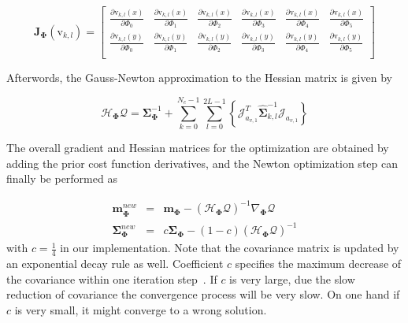 \begin{equation}
  \label{eq:bigj}
\mathbf{J}_{\mathbf{\Phi}}(\mathrm{v}_{k,l}) =
\left[ {\begin{array}{cccccc}
\frac{\partial \mathrm{v}_{k,l}(x)}{\partial \Phi_0}& \frac{\partial \mathrm{v}_{k,l}(x)}{\partial \Phi_1}& \frac{\partial \mathrm{v}_{k,l}(x)}{\partial \Phi_2}& \frac{\partial \mathrm{v}_{k,l}(x)}{\partial \Phi_3}&\frac{\partial \mathrm{v}_{k,l}(x)}{\partial \Phi_4} &\frac{\partial \mathrm{v}_{k,l}(x)}{\partial \Phi_5}  \\
\frac{\partial \mathrm{v}_{k,l}(y)}{\partial \Phi_0}& \frac{\partial \mathrm{v}_{k,l}(y)}{\partial \Phi_1}& \frac{\partial \mathrm{v}_{k,l}(y)}{\partial \Phi_2}& \frac{\partial \mathrm{v}_{k,l}(y)}{\partial \Phi_3}&\frac{\partial \mathrm{v}_{k,l}(y)}{\partial \Phi_4} &\frac{\partial \mathrm{v}_{k,l}(y)}{\partial \Phi_5}  \\
 \end{array} } \right]
\end{equation}

Afterwords, the Gauss-Newton approximation to the Hessian
matrix is given by

\begin{equation}
  \label{eq:hessian}
  \mathcal{H}_{\mathbf{\Phi}} \mathcal{Q}  =
  \mathbf{\Sigma}_{\mathbf{\Phi}}^{-1} + \sum_{k = 0}^{N_{c}-1}
  \sum_{l=0}^{2L-1} \left\{\mathcal{J}_{a_{v,1}}^T\hat{\mathbf{\Sigma}}_{k,l}^{-1}\mathcal{J}_{a_{v,1}}\right\}
\end{equation}


The overall gradient and Hessian matrices for the optimization
are obtained by adding the prior cost function
derivatives, and the Newton optimization step can finally be
performed as

\begin{eqnarray}
\label{eq:newton}
  \mathbf{m}_{\mathbf{\Phi}}^{new} & = &
  \mathbf{m}_{\mathbf{\Phi}} - (\mathcal{H}_{\mathbf{\Phi}}
  \mathcal{Q})^{-1} \nabla_{\mathbf{\Phi}} \mathcal{Q} \nonumber \\
  \mathbf{\Sigma}_{\mathbf{\Phi}}^{new} & = &
  c\mathbf{\Sigma}_{\mathbf{\Phi}} - (1-c)(\mathcal{H}_{\mathbf{\Phi}}
  \mathcal{Q})^{-1}
\end{eqnarray}
with $c = \frac{1}{4}$ in our implementation. Note that the covariance
matrix is updated by an exponential decay rule as well. Coefficient $c$ specifies the
maximum decrease of the covariance within one iteration step~\cite{hanek2004contracting}. If $c$ is very large, due the slow reduction of covariance the
convergence process will be very slow. On one hand if $c$ is
very small, it might converge to a wrong solution.

